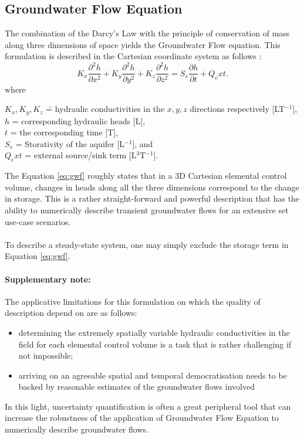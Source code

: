 \subsection{Groundwater Flow Equation}
The combination of the Darcy's Law with the principle of conservation of mass along three dimensions of space yields the Groundwater Flow equation. This formulation is described in the Cartesian coordinate system as follows \cite{freeze}:
\begin{equation} \label{eq:gwf}
    K_x\frac{\partial ^2h}{\partial x^2} +K_y\frac{\partial ^2h}{\partial y^2}+K_z\frac{\partial ^2h}{\partial z^2} =S_s\frac{\partial h}{\partial t} +Q_ext.
\end{equation}
where
\begin{tabbing}
    $K_x, K_y, K_z$ \hspace{.4in}\= = hydraulic conductivities in the $x, y, z$ directions respectively [LT$^{-1}$], \\ 
    $h$ \>= corresponding hydraulic heads [L], \\
    $t$ \>= the corresponding time [T], \\
    $S_s$ \>= Storativity of the aquifer [L$^{-1}$], and\\
    $Q_ext$ \>= external source/sink term  [L$^3$T$^{-1}$].\\
\end{tabbing}
The Equation \ref{eq:gwf} roughly states that in a 3D Cartesian elemental control volume, changes in heads along all the three dimensions correspond to the change in storage. This is a rather straight-forward and powerful description that has the ability to numerically describe transient groundwater flows for an extensive set use-case scenarios.
\\ \\
To describe a steady-state system, one may simply exclude the storage term in Equation \ref{eq:gwf}.
\paragraph*{Supplementary note:}
The applicative limitations for this formulation on which the quality of description depend on are as follows:
\begin{itemize}
    \item determining the extremely spatially variable hydraulic conductivities in the field for each elemental control volume is a task that is rather challenging if not impossible;
    \item arriving on an agreeable spatial and temporal democratisation needs to be backed by reasonable estimates of the groundwater flows involved 
\end{itemize}
In this light, uncertainty quantification is often a great peripheral tool that can increase the robustness of the application of Groundwater Flow Equation to numerically describe groundwater flows.
\\ \\



